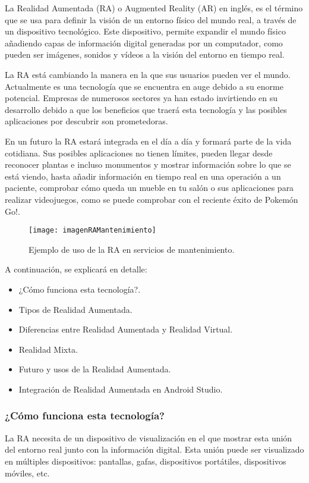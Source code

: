 La Realidad Aumentada (RA) \cite{URL::RealidadAumentada} o Augmented Reality (AR) en inglés, es el término que se usa para definir la visión de un entorno físico del mundo real, a través de un dispositivo tecnológico. Este dispositivo, permite expandir el mundo físico añadiendo capas de información digital generadas por un computador, como pueden ser imágenes, sonidos y vídeos a la visión del entorno en tiempo real. 

La RA está cambiando la manera en la que sus usuarios pueden ver el mundo. Actualmente es una tecnología que se encuentra en auge debido a su enorme potencial. Empresas de numerosos sectores ya han estado invirtiendo en su desarrollo debido a que los beneficios que traerá esta tecnología y las posibles aplicaciones por descubrir son prometedoras.


En un futuro la RA estará integrada en el día a día y formará parte de la vida cotidiana. Sus posibles aplicaciones no tienen límites, pueden llegar desde reconocer plantas e incluso monumentos y mostrar información sobre lo que se está viendo, hasta añadir información en tiempo real en una operación a un paciente, comprobar cómo queda un mueble en tu salón o sus aplicaciones para realizar videojuegos, como se puede comprobar con el reciente éxito de Pokemón Go!. 

\begin{figure}[h]
    \centering
    \texttt{[image: imagenRAMantenimiento]}
    \caption{Ejemplo de uso de la RA en servicios de mantenimiento.}
    \label{fig:googleglass}
\end{figure}

A continuación, se explicará en detalle:
\begin{itemize}
\item ¿Cómo funciona esta tecnología?.
\item Tipos de Realidad Aumentada.
\item Diferencias entre Realidad Aumentada y Realidad Virtual.
\item Realidad Mixta.
\item Futuro y usos de la Realidad Aumentada.
\item Integración de Realidad Aumentada en Android Studio.
\end{itemize}  

\subsubsection{¿Cómo funciona esta tecnología?}
La RA necesita de un dispositivo de visualización en el que mostrar esta unión del entorno real junto con la información digital. Esta unión puede ser visualizado en múltiples dispositivos: pantallas, gafas, dispositivos portátiles, dispositivos móviles, etc.
 

